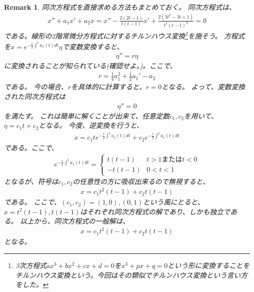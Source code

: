 \documentclass{jsarticle}
\newtheorem{remark}{Remark}
\begin{document}
\begin{remark}
同次方程式を直接求める方法もまとめておく。
同次方程式は、
\begin{align}
x''+a_{1}x'+a_{2}x=x''-\frac{2(2t-1)}{t(t-1)}x'+\frac{2(3t^{2}-3t+1)}{t^{2}(t-1)^{2}}=0
\end{align}
である。線形の2階常微分方程式に対するチルンハウス変換\footnote{3次方程式$ax^{3}+bx^{2}+cx+d=0$を$x^{3}+px+q=0$という形に変換することをチルンハウス変換という。今回はその類似でチルンハウス変換という言い方をした。}を施そう。
方程式を$x=e^{-\frac{1}{2}\int^{t} a_{1}(t)dt}\eta$で変数変換すると、
\begin{align}
\eta''=r\eta
\end{align}
に変換されることが知られている(確認せよ。)。ここで、
\begin{align}
r=\frac{1}{4}a_{1}^{2}+\frac{1}{2}a_{1}'-a_{2}
\end{align}
である。
今の場合、$r$を具体的に計算すると、$r=0$となる。
よって、変数変換された同次方程式は
\begin{align}
\eta''=0
\end{align}
を満たす。
これは簡単に解くことが出来て、任意定数$c_{1},c_{2}$を用いて、
$\eta=c_{1}t+c_{2}$となる。
今度、逆変換を行うと、
\begin{align}
x=c_{1}te^{-\frac{1}{2}\int^{t} a_{1}(t)dt}+c_{2}e^{-\frac{1}{2}\int^{t} a_{1}(t)dt}
\end{align}
である。ここで、
\begin{align}
e^{-\frac{1}{2}\int^{t} a_{1}(t)dt}=
\begin{cases}
t(t-1) & \text{$t>1$または$t<0$}\\
-t(t-1) & \text{$0<t<1$}
\end{cases}
\end{align}
となるが、符号は$c_{1},c_{2}$の任意性の方に吸収出来るので無視すると、
\begin{align}
x=c_{1}t^{2}(t-1)+c_{2}t(t-1)
\end{align}
である。
ここで、$(c_{1},c_{2})=(1,0),(0,1)$という風にとると、
$x=t^{2}(t-1),t(t-1)$はそれぞれ同次方程式の解であり、しかも独立である。
以上から、同次方程式の一般解は、
\begin{align}
x=c_{1}t^{2}(t-1)+c_{2}t(t-1)
\end{align}
となる。
\end{remark}
\end{document}
